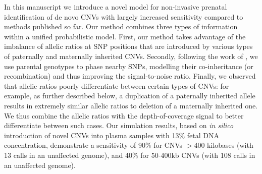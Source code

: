 In this manuscript we introduce a novel model for non-invasive prenatal identification of de novo CNVs with largely increased sensitivity compared to methods published so far. Our method combines three types of information within a unified probabilistic model. First, our method takes advantage of the imbalance of allelic ratios at SNP positions that are introduced by various types of paternally and maternally inherited CNVs. Secondly, following the work of \cite{kitzman2012}, we use parental genotypes to phase nearby SNPs, modelling their co-inheritance (or recombination) and thus improving the signal-to-noise ratio. Finally, we observed that allelic ratios poorly differentiate between certain types of CNVs: for example, as further described below,  a duplication of a paternally inherited allele results in extremely similar allelic ratios to deletion of a maternally inherited one. We thus combine the allelic ratios with the depth-of-coverage signal to better differentiate between such cases. Our simulation results, based on \emph{in silico} introduction of novel CNVs into plasma samples with 13\% fetal DNA concentration, demonstrate a sensitivity of 90\% for CNVs $>$400 kilobases (with 13 calls in an unaffected genome),  and 40\% for 50-400kb CNVs (with 108 calls in an unaffected genome). 


